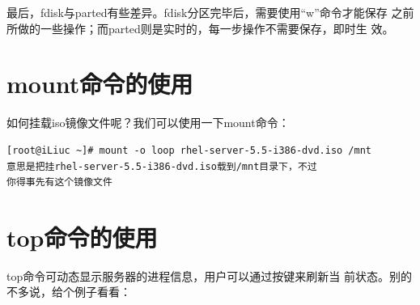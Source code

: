 最后，fdisk与parted有些差异。fdisk分区完毕后，需要使用“w”命令才能保存
之前所做的一些操作；而parted则是实时的，每一步操作不需要保存，即时生
效。

\section{mount命令的使用}
\label{sec:mountCmd}

如何挂载iso镜像文件呢？我们可以使用一下mount命令：

\small{
\begin{verbatim}
[root@iLiuc ~]# mount -o loop rhel-server-5.5-i386-dvd.iso /mnt
意思是把挂rhel-server-5.5-i386-dvd.iso载到/mnt目录下，不过
你得事先有这个镜像文件
\end{verbatim}
}
\normalsize







\section{top命令的使用}
\label{sec:topCmd}

top命令可动态显示服务器的进程信息，用户可以通过按键来刷新当
前状态。别的不多说，给个例子看看：


